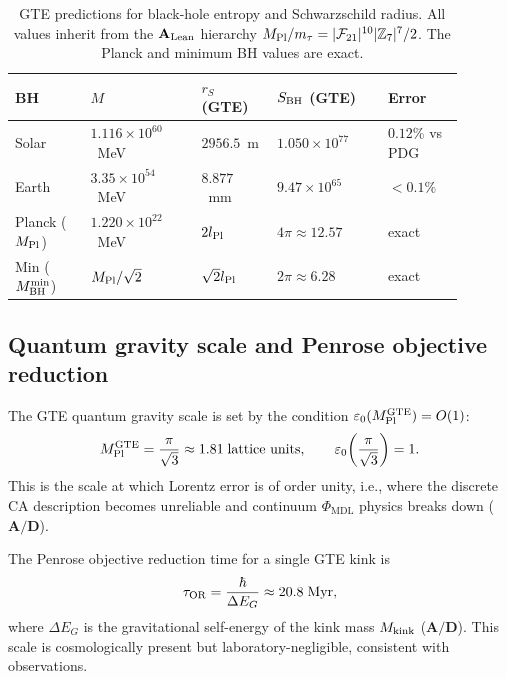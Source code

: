 \documentclass[11pt]{article}
\theoremstyle{remark}
\newcommand{\GTE}{\text{GTE}}
\newcommand{\PHIMDL}{\Phi_{\mathrm{MDL}}}
\newcommand{\ZS}{\mathbb{Z}_7}
\newcommand{\epsz}{\varepsilon_0}
\newcommand{\Mkink}{M_{\rm kink}}
\newcommand{\MPltot}{M_{\rm Pl}^{\GTE}}
\newcommand{\FTT}{\mathcal{F}_{21}}
\newcommand{\CatAL}{\ensuremath{\textbf{A}_{\rm Lean}}}
\newcommand{\CatAD}{\textbf{A/D}}
\begin{document}
\begin{table}[h]
\small
\centering
\renewcommand{\arraystretch}{1.2}
\begin{tabular}{@{}P{0.15\linewidth}P{0.22\linewidth}P{0.15\linewidth}P{0.22\linewidth}P{0.15\linewidth}@{}}
\toprule
\textbf{BH} & $M$ & $r_S$ (GTE) & $S_{\rm BH}$ (GTE) & Error\\
\midrule
Solar & $1.116\times10^{60}$~MeV & $2956.5$~m & $1.050\times10^{77}$ & $0.12\%$ vs PDG\\
Earth & $3.35\times10^{54}$~MeV  & $8.877$~mm  & $9.47\times10^{65}$ & $<0.1\%$\\
Planck ($M_{\rm Pl}$) & $1.220\times10^{22}$~MeV & $2l_{\rm Pl}$ & $4\pi\approx12.57$ & exact\\
Min ($M_{\rm BH}^{\rm min}$) & $M_{\rm Pl}/\sqrt{2}$ & $\sqrt{2}l_{\rm Pl}$ & $2\pi\approx6.28$ & exact\\
\bottomrule
\end{tabular}
\caption{GTE predictions for black-hole entropy and Schwarzschild radius.
All values inherit from the $\CatAL$ hierarchy $M_{\rm Pl}/m_\tau =
|\FTT|^{10}|\ZS|^7/2$.  The Planck and minimum BH values are exact.}
\label{tab:bh_entropy}
\end{table}

\subsection{Quantum gravity scale and Penrose objective reduction}

The GTE quantum gravity scale is set by the condition $\epsz(\MPltot) = O(1)$:
\begin{equation}
  \MPltot = \frac{\pi}{\sqrt{3}} \approx 1.81\;\text{lattice units},
  \qquad
  \epsz\!\left(\frac{\pi}{\sqrt{3}}\right) = 1.
  \label{eq:mpl}
\end{equation}
This is the scale at which Lorentz error is of order unity, i.e., where
the discrete CA description becomes unreliable and continuum $\PHIMDL$ physics
breaks down ($\CatAD$).

The Penrose objective reduction time for a single GTE kink is
\begin{equation}
  \tau_{\rm OR} = \frac{\hbar}{\Delta E_G}
  \approx 20.8\;\text{Myr},
  \label{eq:tau_or}
\end{equation}
where $\Delta E_G$ is the gravitational self-energy of the kink mass
$\Mkink$ ($\CatAD$).  This scale is cosmologically present but
laboratory-negligible, consistent with observations.
\end{document}
